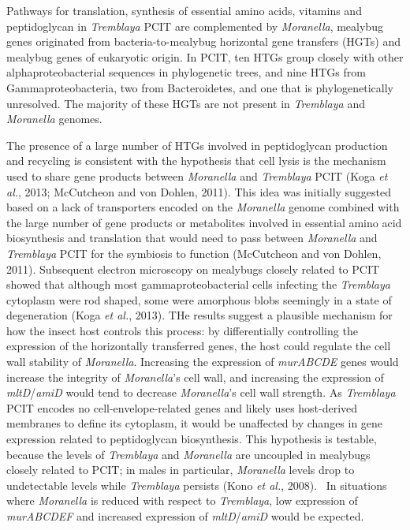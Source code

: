 \documentclass[11pt]{article}
\begin{document}
\newline

Pathways for translation, synthesis of essential amino acids, vitamins and peptidoglycan in \textit{Tremblaya} PCIT are complemented by \textit{Moranella}, mealybug genes originated from bacteria-to-mealybug horizontal gene transfers (HGTs) and mealybug genes of eukaryotic origin. 
In PCIT, ten HTGs group closely with other alphaproteobacterial sequences in phylogenetic trees, and nine HTGs from Gammaproteobacteria, two from Bacteroidetes, and one that is phylogenetically unresolved. 
The majority of these HGTs are not present in \textit{Tremblaya} and \textit{Moranella} genomes. 

\newline

The presence of a large number of HTGs involved in peptidoglycan production and recycling is consistent with the hypothesis that cell lysis is the mechanism used to share gene products between \textit{Moranella} and \textit{Tremblaya} PCIT (Koga \textit{et al.}, 2013; McCutcheon and von Dohlen, 2011). 
This idea was initially suggested based on a lack of transporters encoded on the \textit{Moranella} genome combined with the large number of gene products or metabolites involved in essential amino acid biosynthesis and translation that would need to pass between \textit{Moranella} and \textit{Tremblaya} PCIT for the symbiosis to function (McCutcheon and von Dohlen, 2011). 
Subsequent electron microscopy on mealybugs closely related to PCIT showed that although most gammaproteobacterial cells infecting the \textit{Tremblaya} cytoplasm were rod shaped, some were amorphous blobs seemingly in a state of degeneration (Koga \textit{et al.}, 2013).
THe results suggest a plausible mechanism for how the insect host controls this process: by differentially controlling the
expression of the horizontally transferred genes, the host could regulate the cell wall stability of \textit{Moranella}. Increasing the expression of \textit{murABCDE} genes would increase the integrity of \textit{Moranella}’s cell wall, and increasing the expression of \textit{mltD}/\textit{amiD} would tend to decrease \textit{Moranella}’s cell wall strength. 
As \textit{Tremblaya} PCIT encodes no cell-envelope-related genes and likely uses host-derived membranes to define its cytoplasm, it would be unaffected by changes in gene expression related to peptidoglycan biosynthesis. 
This hypothesis is testable, because the levels of \textit{Tremblaya} and \textit{Moranella} are uncoupled in mealybugs closely related to PCIT; in males in particular, \textit{Moranella} levels drop to undetectable levels while \textit{Tremblaya} persists (Kono \textit{et al.}, 2008). \
In situations where \textit{Moranella} is reduced with respect to \textit{Tremblaya}, low expression of \textit{murABCDEF} and increased expression of \textit{mltD}/\textit{amiD} would be expected. 
\end{document}
